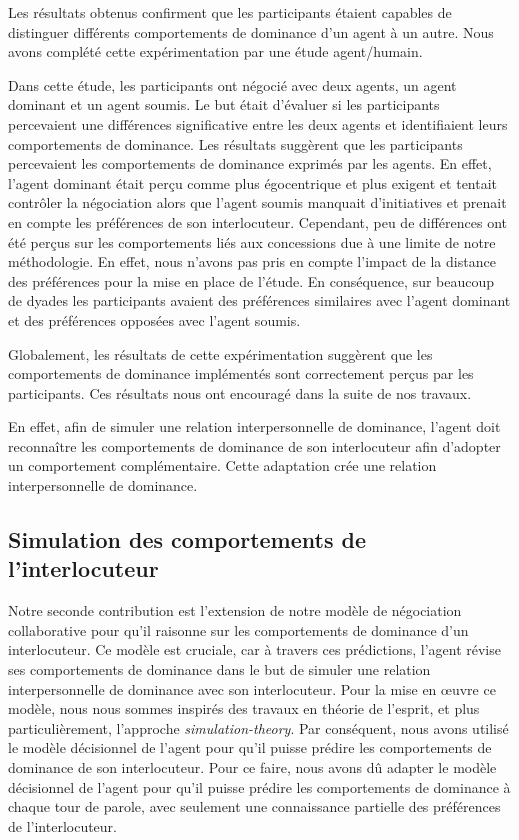 	Les résultats obtenus confirment que les participants étaient capables de distinguer différents comportements de dominance d'un agent à un autre. Nous avons complété cette expérimentation par une étude agent/humain. 
	
	Dans cette étude, les participants ont négocié avec deux agents, un agent dominant et un agent soumis. Le but était d'évaluer si les participants percevaient une différences significative entre les deux agents et identifiaient leurs comportements de dominance.
	Les résultats suggèrent que les participants percevaient les comportements de dominance exprimés par les agents. En effet, l'agent dominant était perçu comme plus égocentrique et plus exigent et tentait contrôler la négociation alors que l'agent soumis manquait d'initiatives et prenait en compte les préférences de son interlocuteur. Cependant, peu de différences ont été perçus sur les comportements liés aux concessions due à une limite de notre méthodologie. En effet, nous n'avons pas pris en compte l'impact de la distance des préférences pour la mise en place de l'étude. En conséquence, sur beaucoup de dyades les participants avaient des préférences similaires avec l'agent dominant et des préférences opposées avec l'agent soumis. 
	
	Globalement, les résultats de cette expérimentation suggèrent que les comportements de dominance implémentés sont correctement perçus par les participants. Ces résultats nous ont encouragé dans la suite de nos travaux. 
	
	En effet, afin de simuler une relation interpersonnelle de dominance, l'agent doit reconnaître les comportements de dominance de son interlocuteur afin d'adopter un comportement complémentaire. Cette adaptation crée une relation interpersonnelle de dominance.  
	
	\subsection{Simulation des comportements de l'interlocuteur}
	
		Notre seconde contribution est l'extension de notre modèle de négociation collaborative pour qu'il raisonne sur les comportements de dominance d'un interlocuteur. Ce modèle est cruciale, car à travers ces prédictions, l'agent révise ses comportements de dominance dans le but de simuler une relation interpersonnelle de dominance avec son interlocuteur. 
		Pour la mise en œuvre ce modèle, nous nous sommes inspirés des travaux en théorie de l'esprit, et plus particulièrement, l'approche \emph{simulation-theory}. Par conséquent, nous avons utilisé le modèle décisionnel de l'agent pour qu'il puisse prédire les comportements de dominance de son interlocuteur. 
		Pour ce faire, nous avons dû adapter le modèle décisionnel de l'agent pour qu'il puisse prédire les comportements de dominance à chaque tour de parole, avec seulement une connaissance partielle des préférences de l'interlocuteur. 
		
